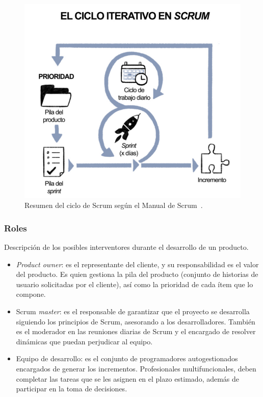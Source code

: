 \begin{figure}[h]
	\caption[Scrum: resumen del ciclo]{Resumen del ciclo de Scrum según el Manual de Scrum~\cite{scrumMaster2022}.}
	\label{img:ciclo_scrum}
	\centering
	\includegraphics[scale=0.45]{../img/anexos/scrum/ciclo}
\end{figure}

\subsubsection{Roles}
Descripción de los posibles interventores durante el desarrollo de un producto.

\begin{itemize}
	\item \textit{Product owner}: es el representante del cliente, y su responsabilidad es el valor del producto. Es quien gestiona la pila del producto (conjunto de historias de usuario solicitadas por el cliente), así como la prioridad de cada ítem que lo compone.
	
	\item Scrum \textit{master}: es el responsable de garantizar que el proyecto se desarrolla siguiendo los principios de Scrum, asesorando a los desarrolladores. También es el moderador en las reuniones diarias de Scrum y el encargado de resolver dinámicas que puedan perjudicar al equipo.
	
	\item Equipo de desarrollo: es el conjunto de programadores autogestionados encargados de generar los incrementos. Profesionales multifuncionales, deben completar las tareas que se les asignen en el plazo estimado, además de participar en la toma de decisiones.
\end{itemize}

